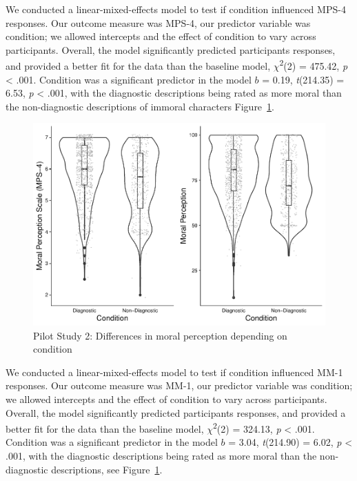 \documentclass[
  american,
  man,floatsintext]{apa7}
\begin{document}
We conducted a linear-mixed-effects model to test if condition influenced MPS-4 responses. Our outcome measure was MPS-4, our predictor variable was condition; we allowed intercepts and the effect of condition to vary across participants.
Overall, the model significantly predicted participants responses, and provided a better fit for the data than the baseline model, \(\chi\)\textsuperscript{2}(2) = 475.42, \emph{p} \textless{} .001. Condition was a significant predictor in the model \(b\) = 0.19, \emph{t}(214.35) = 6.53, \emph{p} \textless{} .001, with the diagnostic descriptions being rated as more moral than the non-diagnostic descriptions of immoral characters Figure~\ref{fig:pilot2bothconditionplot}.

\begin{figure}
\centering
\includegraphics{moral_dilution_in_chunks_files/figure-latex/pilot2bothconditionplot-1.pdf}
\caption{\label{fig:pilot2bothconditionplot}Pilot Study 2: Differences in moral perception depending on condition}
\end{figure}

We conducted a linear-mixed-effects model to test if condition influenced MM-1 responses. Our outcome measure was MM-1, our predictor variable was condition; we allowed intercepts and the effect of condition to vary across participants. Overall, the model significantly predicted participants responses, and provided a better fit for the data than the baseline model, \(\chi\)\textsuperscript{2}(2) = 324.13, \emph{p} \textless{} .001. Condition was a significant predictor in the model \(b\) = 3.04, \emph{t}(214.90) = 6.02, \emph{p} \textless{} .001, with the diagnostic descriptions being rated as more moral than the non-diagnostic descriptions, see Figure~\ref{fig:pilot2bothconditionplot}.
\end{document}
